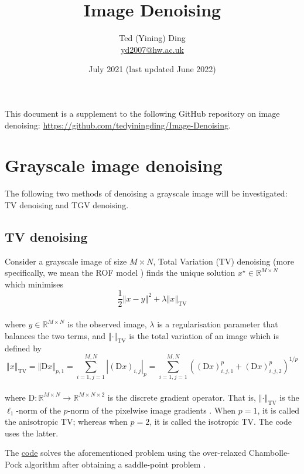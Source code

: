 \documentclass{article}
\title{Image Denoising}
\author{Ted (Yining) Ding\\
\href{mailto:yd2007@hw.ac.uk}{yd2007@hw.ac.uk}}
\date{July 2021 (last updated June 2022)}
\begin{document}
\maketitle

This document is a supplement to the following GitHub repository on image denoising: \url{https://github.com/tedyiningding/Image-Denoising}.

\section*{Grayscale image denoising} \label{sec:gray_denoising}
The following two methods of denoising a grayscale image will be investigated: TV denoising and TGV denoising.

\subsection*{TV denoising} \label{sec:tv_denoising}
Consider a grayscale image of size \(M \times N\), Total Variation (TV) denoising (more specifically, we mean the ROF model \cite{rudin1992nonlinear}) finds the unique solution \(x^\star \in \mathbb{R}^{M \times N}\) which minimises\\
%
\[\frac{1}{2} \left\Vert x-y \right\Vert ^2 + \lambda \left\Vert x \right\Vert_{\text{TV}}\]\\
%
where \(y \in \mathbb{R}^{M \times N}\) is the observed image, \(\lambda\) is a regularisation parameter that balances the two terms, and \(\left\Vert \cdot \right\Vert_{\text{TV}}\) is the total variation of an image which is defined by \\
%
\[\left\Vert x \right\Vert_{\text{TV}} = \left\Vert \mathrm{D} x \right\Vert_{p,1} = \sum_{i=1,j=1}^{M,N} \left| \left( \mathrm{D} x \right)_{i,j} \right|_p = \sum_{i=1,j=1}^{M,N} \left( \left( \mathrm{D} x \right)_{i,j,1}^p + \left( \mathrm{D} x \right)_{i,j,2}^p \right)^{1/p}\]\\
%
where \(\mathrm{D}: \mathbb{R}^{M \times N} \rightarrow \mathbb{R}^{M \times N \times 2}\) is the discrete gradient operator. That is, \(\left\Vert \cdot \right\Vert_{\text{TV}}\) is the \(\ell_1\)-norm of the \(p\)-norm of the pixelwise image gradients \cite[pp. 168]{chambolle2016introduction}. When \(p=1\), it is called the anisotropic TV; whereas when \(p=2\), it is called the isotropic TV. The code uses the latter.

The \href{https://github.com/tedyiningding/Image-Denoising/blob/main/TVdenoise.m}{code} solves the aforementioned problem using the over-relaxed Chambolle-Pock algorithm \cite[Algorithm 3.1]{condat2013primal} after obtaining a saddle-point problem \cite[Example 5.6]{chambolle2016introduction}.
\end{document}

